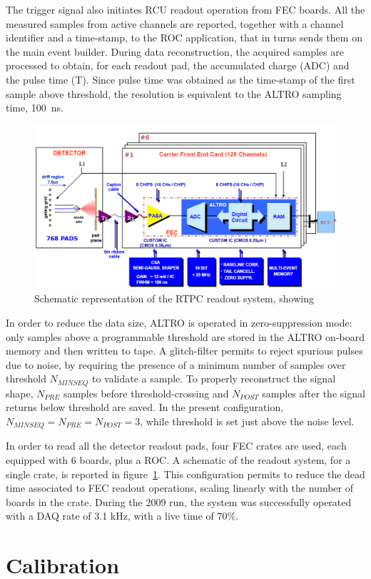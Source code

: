 \documentclass[twocolumn,showpacs,superscriptaddress,groupedaddress]{revtex4}
\begin{document}
The trigger signal also initiates RCU readout operation from FEC boards. All 
the measured samples from active channels are reported, together with a channel 
identifier and a time-stamp, to the ROC application, that in turns sends them 
on the main event builder. During data reconstruction, the acquired samples are 
processed to obtain, for each readout pad, the accumulated charge (ADC) and the 
pulse time (T). Since pulse time was obtained as the time-stamp of the first 
sample above threshold, the resolution is equivalent to the ALTRO sampling 
time, 100~ns.

\begin{figure}[tb]
   \centering
   \includegraphics[width=.45\textwidth]{fig/ReadoutScheme.png}
   \caption[]{Schematic representation of the RTPC readout system, showing} 
   \label{fig:ReadoutScheme}
\end{figure}

In order to reduce the data size, ALTRO is operated in zero-suppression mode: 
only samples above a programmable threshold are stored in the ALTRO on-board 
memory and then written to tape. A glitch-filter permits to reject spurious 
pulses due to noise, by requiring the presence of a minimum number of samples 
over threshold $N_{MINSEQ}$ to validate a sample. To properly reconstruct 
the signal shape, $N_{PRE}$ samples before threshold-crossing and $N_{POST}$ 
samples after the signal returns below threshold are saved. In the present 
configuration, $N_{MINSEQ}=N_{PRE}=N_{POST}=3$, while threshold is set just 
above the noise level. 

In order to read all the detector readout pads, four FEC crates are used, 
each equipped with 6 boards, plus a ROC. A schematic of the readout system, 
for a single crate, is reported in figure~\ref{fig:ReadoutScheme}. This 
configuration permits to reduce the dead time associated to FEC readout 
operations, scaling linearly with the number of boards in the crate. During the 
2009 run, the system was successfully operated with a DAQ rate of 3.1 kHz, with 
a live time of $70 \%$.

\section{Calibration} \label{sec_calib}
\end{document}
